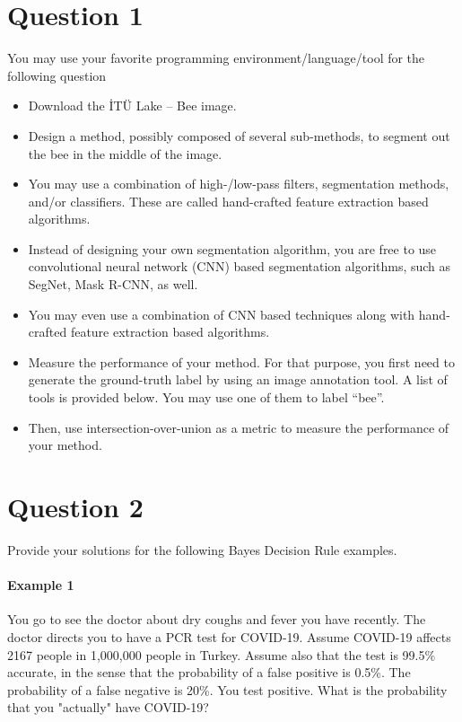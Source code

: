 \documentclass[12pt]{article}
\begin{document}
\maketitle

\section{Question 1}\label{sec:q1}
You may use your favorite programming environment/language/tool for the following question
\begin{itemize}
    \item Download the İTÜ Lake – Bee image.
    \item Design a method, possibly composed of several sub-methods, to segment out the bee in the middle of the image.
    \item You may use a combination of high-/low-pass filters, segmentation methods, and/or classifiers. These are called hand-crafted feature extraction based algorithms.
    \item Instead of designing your own segmentation algorithm, you are free to use convolutional neural network (CNN) based segmentation algorithms, such as SegNet, Mask R-CNN, as well. 
    \item You may even use a combination of CNN based techniques along with hand-crafted feature extraction based algorithms. 
    \item Measure the performance of your method. For that purpose, you first need to generate the ground-truth label by using an image annotation tool. A list of tools is provided below. You may use one of them to label “bee”.  
    \item Then, use intersection-over-union as a metric to measure the performance of your method.
\end{itemize}

\pagebreak
\section{Question 2}\label{sec:q2}
Provide your solutions for the following Bayes Decision Rule examples.
\paragraph{Example 1}
You go to see the doctor about dry coughs and fever you have recently. The doctor directs you to have a PCR test for COVID-19.  Assume COVID-19 affects 2167 people in 1,000,000 people in Turkey. Assume also that the test is 99.5\% accurate, in the sense that the probability of a false positive is 0.5\%. The probability of a false negative is 20\%. You test positive. What is the probability that you "actually" have COVID-19?
\end{document}
